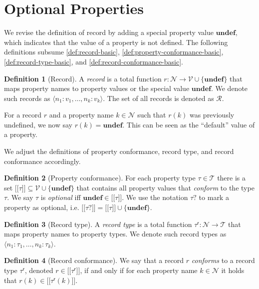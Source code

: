 \documentclass{report}
\theoremstyle{definition}
\newtheorem{definition}{Definition}
\newcommand{\ptype}{\tau}
\newcommand{\ptypes}{\mathcal{T}}
\newcommand{\rtype}{\tau^\mathsf{r}}
\newcommand{\lsem}{\ensuremath{[\![}}
\newcommand{\rsem}{\ensuremath{]\!]}}
\newcommand{\sem}[1]{\ensuremath{\lsem #1 \rsem}}
\newcommand{\undefined}{\mathbf{undef}}
\begin{document}
\section{Optional Properties}
\label{sec:optional-properties}

We revise the definition of record by adding a special property value $\undefined$, which indicates that the value of a property is not defined. The following definitions subsume \autoref{def:record-basic}, \ref{def:property-conformance-basic}, \ref{def:record-type-basic}, and \ref{def:record-conformance-basic}.

\begin{definition}[Record]
  \label{def:record}
  A \emph{record} is a total function $r : \mathcal{N} \to \mathcal{V} \cup \{\undefined\}$ that maps property names to property values or the special value $\undefined$. We denote such records as $\langle n_1 : v_1, \ldots, n_k : v_k \rangle$. The set of all records is denoted as $\mathcal{R}$.
\end{definition}

For a record $r$ and a property name $k \in \mathcal{N}$ such that $r(k)$ was previously undefined, we now say $r(k) = \undefined$. This can be seen as the ``default'' value of a property.

We adjust the definitions of property conformance, record type, and record conformance accordingly.

\begin{definition}[Property conformance]
  \label{def:property-conformance}
  For each property type $\ptype \in \ptypes$ there is a set $\sem{\ptype} \subseteq \mathcal{V} \cup \{\undefined\}$ that contains all property values that \emph{conform} to the type $\ptype$. We say $\ptype$ is \emph{optional} iff $\undefined \in \sem{\ptype}$. We use the notation $\ptype?$ to mark a property as optional, i.e. $\sem{\ptype?} = \sem{\ptype} \cup \{ \undefined \}$.
\end{definition}

\begin{definition}[Record type]
  \label{def:record-type}
  A \emph{record type} is a total function $\rtype : \mathcal{N} \to \ptypes$ that maps property names to property types. We denote such record types as $\langle n_1 : \ptype_1, \ldots, n_k : \ptype_k \rangle$.
\end{definition}

\begin{definition}[Record conformance]
  \label{def:record-conformance}
  We say that a record $r$ \emph{conforms} to a record type $\rtype$, denoted $r \in \sem{\rtype}$, if and only if for each property name $k \in \mathcal{N}$ it holds that $r(k) \in \sem{\rtype(k)}$.
\end{definition}
\end{document}

